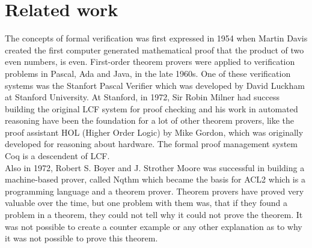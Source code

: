 \chapter{Related work}
The concepts of formal verification was first expressed in 1954 when Martin Davis created the first computer generated mathematical proof that the product of two even numbers, is even. First-order theorem provers were applied to verification problems in Pascal, Ada and Java, in the late 1960s.  One of these verification systems was the Stanfort Pascal Verifier\cite{Verifier1979} which was developed by David Luckham at Stanford University.
At Stanford, in 1972, Sir Robin Milner had success building the original LCF system for proof checking and his work in automated reasoning have been the foundation for a lot of other theorem provers, like the proof assistant HOL (Higher Order Logic) by Mike Gordon, which was originally developed for reasoning about hardware. The formal proof management system Coq is a descendent of LCF. \\
Also in 1972, Robert S. Boyer and J. Strother Moore was successful in building a machine-based prover, called Nqthm which became the basis for ACL2 which is a programming language and a theorem prover. Theorem provers have proved very valuable over the time, but one problem with them was, that if they found a problem in a theorem, they could not tell why it could not prove the theorem. It was not possible to create a counter example or any other explanation as to why it was not possible to prove this theorem. \\\\


